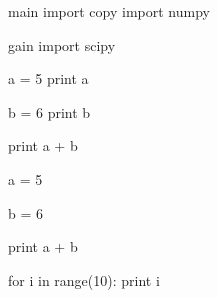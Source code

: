\documentclass[a4paper,12pt]{book}
\begin{document}
\begin{pytexTemplate}{main}
import copy
import numpy
\end{pytexTemplate}


\begin{pytexTemplate}{gain}
import scipy
\end{pytexTemplate}




\begin{pytex}
a = 5
print a
\end{pytex}

\begin{pytex}
b = 6
print b
\end{pytex}

\begin{pytex}
print a + b
\end{pytex}


\begin{pytex}
a = 5
\end{pytex}

\begin{pytex}
b = 6
\end{pytex}

\begin{pytex}
print a + b
\end{pytex}


\begin{pytex}
for i in range(10):
  print i
\end{pytex}
\end{document}
